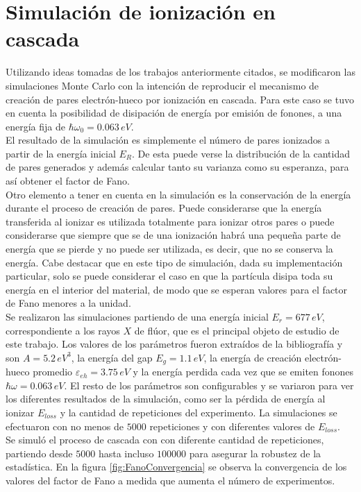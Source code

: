 \section{Simulación de ionización en cascada}
\noindent Utilizando ideas tomadas de los trabajos anteriormente citados, se modificaron las simulaciones Monte Carlo con la intención de reproducir el mecanismo de creación de pares electrón-hueco por ionización en cascada. Para este caso se tuvo en cuenta la posibilidad de disipación de energía por emisión de fonones, a una energía fija de $\hbar\omega_{0} = 0.063\,eV$.\\
\indent El resultado de la simulación es simplemente el número de pares 
ionizados a partir de la energía inicial $E_{R}$. De esta puede verse la distribución de la cantidad de pares generados y además calcular tanto su varianza como su esperanza, para así obtener el factor de Fano.\\
\indent Otro elemento a tener en cuenta en la simulación es la conservación de la energía durante el proceso de creación de pares. Puede considerarse que la energía transferida al ionizar es utilizada totalmente para ionizar otros pares o puede considerarse que siempre que se de una ionización habrá una pequeña parte de energía que se pierde y no puede ser utilizada, es decir, que no se conserva la energía. Cabe destacar que en este tipo de simulación, dada su implementación particular, solo se puede considerar el caso en que la partícula disipa toda su energía en el interior del material, de modo que se esperan valores para el factor de Fano menores a la unidad.\\
\indent Se realizaron las simulaciones partiendo de una energía inicial $E_{r} = 677\,\si{eV}$, correspondiente a los rayos $X$ de flúor, que es el principal objeto de estudio de este trabajo. Los valores de los parámetros fueron extraídos de la bibliografía\cite{Alig}\cite{Ramanathan} y son $A = 5.2\,\si{eV}^{3}$, la energía del gap $E_{g} = 1.1\,\si{eV}$, la energía de creación electrón-hueco promedio $\varepsilon_{eh} = 3.75\,\si{eV}$ y la energía perdida cada vez que se emiten fonones $\hbar \omega = 0.063\,\si{eV}$. El resto de los parámetros son configurables y se variaron para ver los diferentes resultados de la simulación, como ser la pérdida de energía al ionizar $E_{loss}$ y la cantidad de repeticiones del experimento. La simulaciones se efectuaron con no menos de $5000$ repeticiones y con diferentes valores de $E_{loss}$.\\
\indent Se simuló el proceso de cascada con con diferente cantidad de repeticiones, partiendo desde $5000$ hasta incluso $100000$ para asegurar la robustez de la estadística. En la figura \ref{fig:FanoConvergencia} se observa la convergencia de los valores del factor de Fano a medida que aumenta el número de experimentos. 
